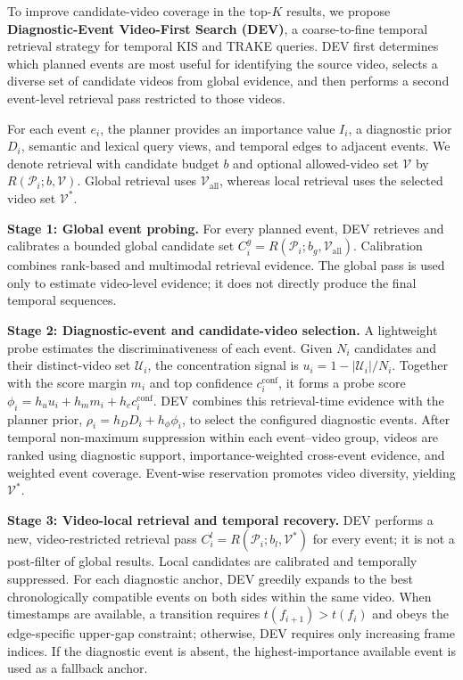 \documentclass[runningheads]{llncs}
\begin{document}
To improve candidate-video coverage in the top-$K$ results, we propose
\textbf{Diagnostic-Event Video-First Search (DEV)}, a coarse-to-fine temporal
retrieval strategy for temporal KIS and TRAKE queries. DEV first determines
which planned events are most useful for identifying the source video, selects
a diverse set of candidate videos from global evidence, and then performs a
second event-level retrieval pass restricted to those videos.

For each event $e_i$, the planner provides an importance value $I_i$, a
diagnostic prior $D_i$, semantic and lexical query views, and temporal edges
to adjacent events. We denote retrieval with candidate budget $b$ and optional
allowed-video set $\mathcal{V}$ by $R(\mathcal{P}_i;b,\mathcal{V})$. Global
retrieval uses $\mathcal{V}_{\mathrm{all}}$, whereas local retrieval uses the
selected video set $\mathcal{V}^{*}$.

\textbf{Stage 1: Global event probing.}
For every planned event, DEV retrieves and calibrates a bounded global candidate
set $C_i^g=R(\mathcal{P}_i;b_g,\mathcal{V}_{\mathrm{all}})$. Calibration
combines rank-based and multimodal retrieval evidence. The global pass is used
only to estimate video-level evidence; it does not directly produce the final
temporal sequences.

\textbf{Stage 2: Diagnostic-event and candidate-video selection.}
A lightweight probe estimates the discriminativeness of each event. Given $N_i$
candidates and their distinct-video set $\mathcal{U}_i$, the concentration
signal is $u_i=1-|\mathcal{U}_i|/N_i$. Together with the score margin $m_i$
and top confidence $c_i^{\mathrm{conf}}$, it forms a probe score
$\phi_i=h_u u_i+h_m m_i+h_c c_i^{\mathrm{conf}}$. DEV combines this
retrieval-time evidence with the planner prior, $\rho_i=h_DD_i+h_\phi\phi_i$,
to select the configured diagnostic events. After temporal non-maximum
suppression within each event--video group, videos are ranked using diagnostic
support, importance-weighted cross-event evidence, and weighted event coverage.
Event-wise reservation promotes video diversity, yielding $\mathcal{V}^{*}$.

\textbf{Stage 3: Video-local retrieval and temporal recovery.}
DEV performs a new, video-restricted retrieval pass
$C_i^l=R(\mathcal{P}_i;b_l,\mathcal{V}^{*})$ for every event; it is not a
post-filter of global results. Local candidates are calibrated and temporally
suppressed. For each diagnostic anchor, DEV greedily expands to the best
chronologically compatible events on both sides within the same video. When
timestamps are available, a transition requires $t(f_{i+1})>t(f_i)$ and obeys
the edge-specific upper-gap constraint; otherwise, DEV requires only increasing
frame indices. If the diagnostic event is absent, the highest-importance
available event is used as a fallback anchor.
\end{document}
